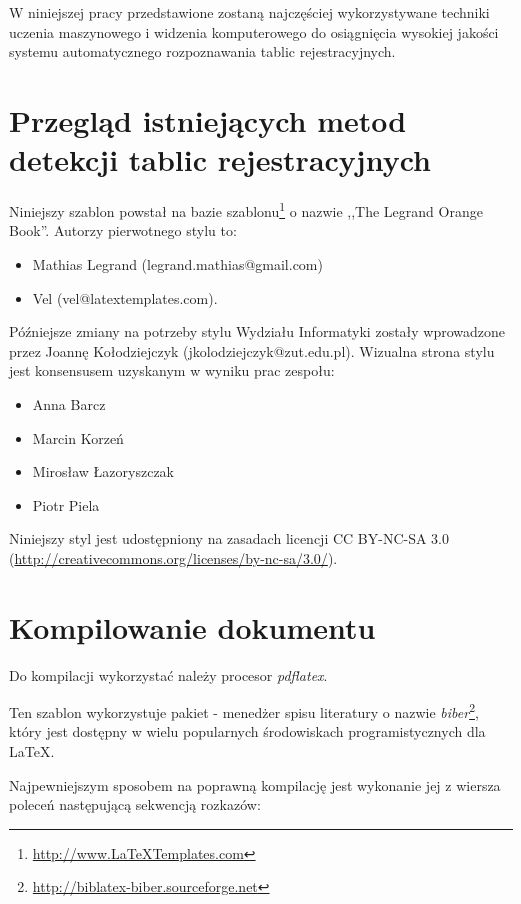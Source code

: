 W niniejszej pracy przedstawione zostaną najczęściej wykorzystywane techniki uczenia maszynowego i widzenia komputerowego do osiągnięcia wysokiej jakości systemu automatycznego rozpoznawania tablic rejestracyjnych.


\section{Przegląd istniejących metod detekcji tablic rejestracyjnych}

Niniejszy szablon powstał na bazie szablonu\footnote{\url{http://www.LaTeXTemplates.com}} o nazwie ,,The Legrand Orange Book''.
Autorzy pierwotnego stylu to:
\begin{itemize}
    \item Mathias Legrand (legrand.mathias@gmail.com)
    \item Vel (vel@latextemplates.com).
\end{itemize}

Późniejsze zmiany na potrzeby stylu Wydziału Informatyki zostały wprowadzone przez Joannę Kołodziejczyk (jkolodziejczyk@zut.edu.pl). Wizualna strona stylu jest konsensusem uzyskanym w wyniku prac zespołu:
\begin{itemize}
    \item Anna Barcz
    \item Marcin Korzeń
    \item Mirosław Łazoryszczak
    \item Piotr Piela
\end{itemize}

Niniejszy styl jest udostępniony na zasadach licencji CC BY-NC-SA 3.0 ({\url{http://creativecommons.org/licenses/by-nc-sa/3.0/}}).


\section{Kompilowanie dokumentu}

Do kompilacji wykorzystać należy procesor {\em pdflatex}.

Ten szablon wykorzystuje pakiet - menedżer spisu literatury o nazwie {\em biber}\footnote{ \url{http://biblatex-biber.sourceforge.net}}, który jest dostępny w wielu popularnych środowiskach programistycznych dla \LaTeX.

Najpewniejszym sposobem na poprawną kompilację jest wykonanie jej z wiersza poleceń następującą sekwencją rozkazów:

